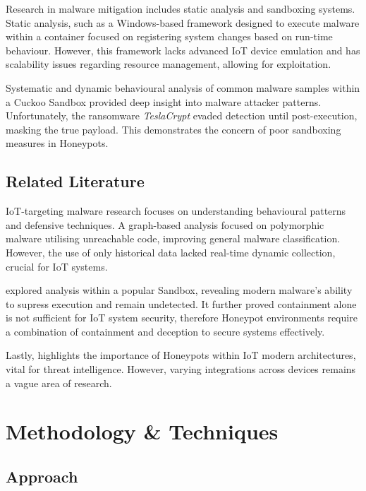 \documentclass[a4paper,12pt,oneside]{book}			%
\begin{document}
Research in malware mitigation includes static analysis and sandboxing systems. Static analysis, such as a Windows-based framework \textit{\citep{static-analysis-drawbacks}} designed to execute malware within a container focused on registering system changes based on run-time behaviour. However, this framework lacks advanced IoT device emulation and has scalability issues regarding resource management, allowing for exploitation. 


Systematic and dynamic behavioural analysis of common malware samples \textit{\citep{analysis-mitigation-sandbox-evasion}} within a Cuckoo Sandbox provided deep insight into malware attacker patterns. Unfortunately, the ransomware \textit{TeslaCrypt} evaded detection until post-execution, masking the true payload. This demonstrates the concern of poor sandboxing measures in Honeypots. 


\section{Related Literature}\label{sec:relatedLiterature}

IoT-targeting malware research focuses on understanding behavioural patterns and defensive techniques. A graph-based analysis \textit{\citep{cornell-malware-analysis}} focused on polymorphic malware utilising unreachable code, improving general malware classification. However, the use of only historical data lacked real-time dynamic collection, crucial for IoT systems.

\textit{\citep{analysis-mitigation-sandbox-evasion}} explored analysis within a popular Sandbox, revealing modern malware’s ability to supress execution and remain undetected. It further proved containment alone is not sufficient for IoT system security, therefore Honeypot environments require a combination of containment and deception to secure systems effectively.

Lastly, \textit{\citep{crowdstrike-honeypot}} highlights the importance of Honeypots within IoT modern architectures, vital for threat intelligence. However, varying integrations across devices remains a vague area of research. 



\chapter{Methodology \&{} Techniques}\label{ch:methods}
\section{Approach}\label{sec:approach}
\end{document}
